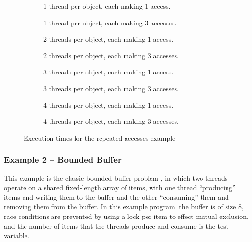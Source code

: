 \documentclass[12pt,a4paper,twoside,openright]{report}
\newenvironment{figtile} %
{\begin{subfigure}{0.48\textwidth}
		\def\svgwidth{\textwidth}
		\captionsetup{font=footnotesize}
	}
	{\end{subfigure}}
\begin{document}
\begin{figure}
	\centering
	\footnotesize
	\begin{figtile}
		
		\caption{1 thread per object,
			each making 1 access.}
	\end{figtile}%
	\quad
	\begin{figtile}
		
		\caption{1 thread per object,
			each making 3 accesses.}
	\end{figtile}
	\begin{figtile}
		
		\caption{2 threads per object,
			each making 1 access.}
	\end{figtile}%
	\quad
	\begin{figtile}
		
		\caption{2 threads per object,
			each making 3 accesses.}
	\end{figtile}
	\begin{figtile}
		
		\caption{3 threads per object,
			each making 1 access.}
	\end{figtile}%
	\quad
	\begin{figtile}
		
		\caption{3 threads per object,
			each making 3 accesses.}
	\end{figtile}
	\begin{figtile}
		
		\caption{4 threads per object,
			each making 1 access.}
	\end{figtile}%
	\quad
	\begin{figtile}
		
		\caption{4 threads per object,
			each making 3 accesses.}
		\label{fig:repeated-access-time-h}
	\end{figtile}
	\caption{Execution times for the repeated-accesses example.}
	\label{fig:repeated-access-time}
\end{figure}

\subsubsection{Example 2 -- Bounded Buffer}
This example is the classic bounded-buffer problem
\cite{dijk74},
in which two threads operate on a shared fixed-length
array of items, with one thread ``producing'' items
and writing them to the buffer and the other
``consuming'' them and removing them from the buffer.
In this example program, the buffer is of size 8,
race conditions are prevented by using a lock per
item to effect mutual exclusion, and the number
of items that the threads produce and consume is
the test variable.
\end{document}

